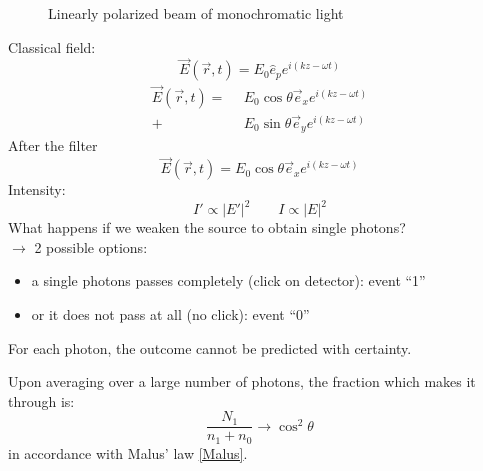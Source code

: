 \noindent
\begin{figure}[h]
	\centering
	\caption{Linearly polarized beam of monochromatic light}
\end{figure}
\noindent
Classical field:
\begin{equation}
\vec{E}(\vec{r},t) = E_0 \hat{e}_{p} e^{i (k z - \omega t)}
\end{equation}
\begin{align*}
\vec{E}(\vec{r},t) = \ \ & E_0 \cos \theta \vec{e}_x e^{i(kz - \omega t)}\\
+ & E_0 \sin \theta \vec{e}_{y} e^{i(kz - \omega t)}
\end{align*}
After the filter
$$ \vec{E}(\vec{r},t) = E_0 \cos\theta \vec{e}_{x}e^{i(kz - \omega t)} $$
Intensity:
\begin{equation*}
I' \propto | E' |^2 \qquad I \propto | E | ^2
\end{equation*}
\noindent
What happens if we weaken the source to obtain single photons?\\
$ \rightarrow $ 2 possible options:
\begin{itemize}
	\item a single photons passes completely (click on detector): event ``1''
	\item or it does not pass at all (no click): event ``0''
\end{itemize}
For each photon, the outcome cannot be predicted with certainty.\par
Upon averaging over a large number of photons, the fraction which makes it through is:
\begin{equation*}
\frac{N_1}{n_1 + n_0} \to \cos^2 \theta
\end{equation*}
in accordance with Malus' law \eqref{Malus}.\\[10pt]
